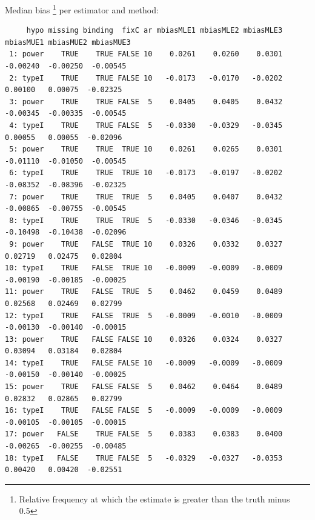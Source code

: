 \documentclass[12pt]{article}
\begin{document}
Median bias \footnote{Relative frequency at which the estimate is greater than the truth minus 0.5} per estimator and method:
\begin{adjustwidth}{-1cm}{-1cm}
\begin{verbatim}
     hypo missing binding  fixC ar mbiasMLE1 mbiasMLE2 mbiasMLE3 mbiasMUE1 mbiasMUE2 mbiasMUE3
 1: power    TRUE    TRUE FALSE 10    0.0261    0.0260    0.0301  -0.00240  -0.00250  -0.00545
 2: typeI    TRUE    TRUE FALSE 10   -0.0173   -0.0170   -0.0202   0.00100   0.00075  -0.02325
 3: power    TRUE    TRUE FALSE  5    0.0405    0.0405    0.0432  -0.00345  -0.00335  -0.00545
 4: typeI    TRUE    TRUE FALSE  5   -0.0330   -0.0329   -0.0345   0.00055   0.00055  -0.02096
 5: power    TRUE    TRUE  TRUE 10    0.0261    0.0265    0.0301  -0.01110  -0.01050  -0.00545
 6: typeI    TRUE    TRUE  TRUE 10   -0.0173   -0.0197   -0.0202  -0.08352  -0.08396  -0.02325
 7: power    TRUE    TRUE  TRUE  5    0.0405    0.0407    0.0432  -0.00865  -0.00755  -0.00545
 8: typeI    TRUE    TRUE  TRUE  5   -0.0330   -0.0346   -0.0345  -0.10498  -0.10438  -0.02096
 9: power    TRUE   FALSE  TRUE 10    0.0326    0.0332    0.0327   0.02719   0.02475   0.02804
10: typeI    TRUE   FALSE  TRUE 10   -0.0009   -0.0009   -0.0009  -0.00190  -0.00185  -0.00025
11: power    TRUE   FALSE  TRUE  5    0.0462    0.0459    0.0489   0.02568   0.02469   0.02799
12: typeI    TRUE   FALSE  TRUE  5   -0.0009   -0.0010   -0.0009  -0.00130  -0.00140  -0.00015
13: power    TRUE   FALSE FALSE 10    0.0326    0.0324    0.0327   0.03094   0.03184   0.02804
14: typeI    TRUE   FALSE FALSE 10   -0.0009   -0.0009   -0.0009  -0.00150  -0.00140  -0.00025
15: power    TRUE   FALSE FALSE  5    0.0462    0.0464    0.0489   0.02832   0.02865   0.02799
16: typeI    TRUE   FALSE FALSE  5   -0.0009   -0.0009   -0.0009  -0.00105  -0.00105  -0.00015
17: power   FALSE    TRUE FALSE  5    0.0383    0.0383    0.0400  -0.00265  -0.00255  -0.00485
18: typeI   FALSE    TRUE FALSE  5   -0.0329   -0.0327   -0.0353   0.00420   0.00420  -0.02551
\end{verbatim}

\end{adjustwidth}

\clearpage
\end{document}
